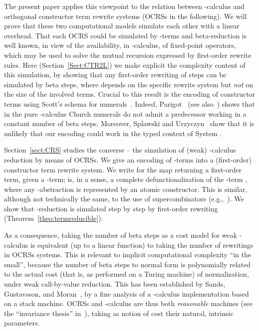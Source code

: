 \documentclass{LMCS}
\newcounter{number}
\begin{document}
The present paper applies this viewpoint to the relation between -calculus and orthogonal constructor 
term rewrite systems (OCRSs in the following). We will prove that these two computational
models simulate each other with a linear overhead. That each OCRS
could be simulated by -terms and beta-reduction is
well known, in view of the availability, in -calculus, of
fixed-point operators, which may be used to solve the mutual recursion expressed by 
first-order rewrite rules. 
Here (Section~\ref{Sect:CTR2L})
we make explicit the complexity content of this simulation, by showing that
any first-order rewriting of  steps can be simulated by  beta steps, where
 depends on the specific rewrite system but \emph{not} on the size of the involved terms.
Crucial to this result is the encoding of constructor terms using Scott's schema for numerals~\cite{Wadsworth80}.
Indeed, Parigot~\cite{Parigot89CSL} (see also~\cite{ParigotRoziere93}) shows that in the pure -calculus
Church numerals do not admit a predecessor working in a constant number of beta steps.
Moreover, Splawski and Urzyczyn~\cite{SplawskiU99} show that it is unlikely that our encoding 
could work in the typed context of System .

Section~\ref{sect:CRS} studies the converse -- the simulation of (weak) -calculus reduction by means of
OCRSs. We give an encoding of -terms into a (first-order) constructor term rewrite 
system. We write    for the map returning a first-order term, given a -term; 
 is, in a sense, a complete defunctionalization of the -term , 
where any -abstraction is represented by an atomic constructor. This is similar, 
although not technically the same, to the use of supercombinators (e.g.,~\cite{PJ87}).
We show that -reduction is simulated step by step by first-order rewriting 
(Theorem~\ref{theo:termreducible}).

As a consequence, taking the number of beta steps as a cost model for weak -calculus
is equivalent (up to a linear function) to taking the number of rewritings in OCRSs
systems. This is relevant to implicit computational complexity ``in the small'', because
the number of beta steps to normal form is polynomially related to the
actual cost (that is, as performed on a Turing machine) of normalization,
under weak call-by-value reduction. This has been established by 
Sands, Gustavsson, and Moran~\cite{Sands:Lambda02}, by a fine analysis of a -calculus implementation based on
a stack machine. OCRSs and -calculus
are thus both \emph{reasonable} machines (see the ``invariance thesis'' in~\cite{vanEmdeBoas90}),
taking as notion of cost their natural, intrinsic parameters.
\end{document}
